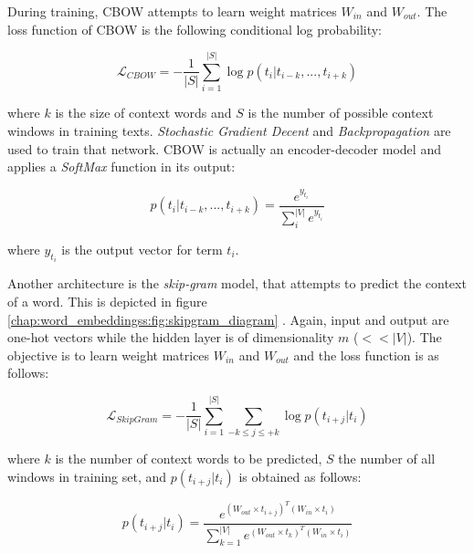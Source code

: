During training, CBOW attempts to learn weight matrices $W_{in}$ and $W_{out}$. The loss function of CBOW is the following conditional log probability: 

\begin{equation} \label{chap:word_embeddings:eq:CBOW_log_likelihood}
	 \mathcal{L}_{CBOW} = -\frac{1}{|S|} \sum_{i=1}^{|S|}{\log{p(t_{i}|t_{i-k}, ... ,t_{i+k})}}
\end{equation}

\noindent
where $k$ is the size of context words and $S$ is the number of possible context windows in training texts. \textit{Stochastic Gradient Decent} and \textit{Backpropagation} are used to train that network. CBOW is actually an encoder-decoder model and applies a \textit{SoftMax} function in its output:  

\begin{equation} \label{chap:word_embeddings:eq:CBOW_softmax}
	p(t_{i}|t_{i-k},...,t_{i+k}) = \frac{e^{y_{t_{i}}}}{\sum^{|V|}_{i}{e^{y_{t_i}}}}
\end{equation}

\nointdent where $y_{t_i}$ is the output vector for term $t_i$.

Another architecture is the \textit{skip-gram} model, that attempts to predict the context of a word. This is depicted in figure \ref{chap:word_embeddingss:fig:skipgram_diagram} \parencite{mitra2018introduction}. Again, input and output are one-hot vectors while the hidden layer is of dimensionality $m$ ($<<|V|$). The objective is to learn weight matrices $W_{in}$ and $W_{out}$ and the loss function is as follows:

\begin{equation} \label{chap:word_embeddings:eq:skipgram_log_likelihood}
	 \mathcal{L}_{SkipGram} = -\frac{1}{|S|} \sum_{i=1}^{|S|}{ \sum_{-k \leq j \leq +k}{ \log {p(t_{i+j}|t_{i})}  } }
\end{equation}

\nointend where $k$ is the number of context words to be predicted, $S$ the number of all windows in training set, and $p(t_{i+j}|t_{i})$ is obtained as follows:

\begin{equation} \label{chap:word_embeddings:eq:skipgram_softmax}
	p(t_{i+j}|t_{i}) = \frac{ e^{(W_{out}  \times  t_{i+j})^{T} (W_{in} \times  t_{i})}}{\sum^{|V|}_{k=1}{ e^{(W_{out}  \times  t_{k})^{T} (W_{in} \times  t_{i})}}} 
\end{equation}

